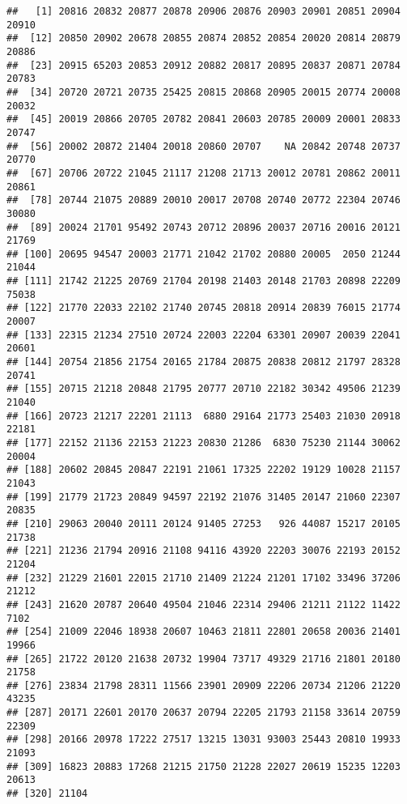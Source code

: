 \documentclass[]{article}
\newenvironment{Shaded}{\begin{snugshade}}{\end{snugshade}}
\newcommand{\KeywordTok}[1]{\textcolor[rgb]{0.13,0.29,0.53}{\textbf{#1}}}
\newcommand{\OperatorTok}[1]{\textcolor[rgb]{0.81,0.36,0.00}{\textbf{#1}}}
\newcommand{\NormalTok}[1]{#1}
\begin{document}
\begin{verbatim}
##   [1] 20816 20832 20877 20878 20906 20876 20903 20901 20851 20904 20910
##  [12] 20850 20902 20678 20855 20874 20852 20854 20020 20814 20879 20886
##  [23] 20915 65203 20853 20912 20882 20817 20895 20837 20871 20784 20783
##  [34] 20720 20721 20735 25425 20815 20868 20905 20015 20774 20008 20032
##  [45] 20019 20866 20705 20782 20841 20603 20785 20009 20001 20833 20747
##  [56] 20002 20872 21404 20018 20860 20707    NA 20842 20748 20737 20770
##  [67] 20706 20722 21045 21117 21208 21713 20012 20781 20862 20011 20861
##  [78] 20744 21075 20889 20010 20017 20708 20740 20772 22304 20746 30080
##  [89] 20024 21701 95492 20743 20712 20896 20037 20716 20016 20121 21769
## [100] 20695 94547 20003 21771 21042 21702 20880 20005  2050 21244 21044
## [111] 21742 21225 20769 21704 20198 21403 20148 21703 20898 22209 75038
## [122] 21770 22033 22102 21740 20745 20818 20914 20839 76015 21774 20007
## [133] 22315 21234 27510 20724 22003 22204 63301 20907 20039 22041 20601
## [144] 20754 21856 21754 20165 21784 20875 20838 20812 21797 28328 20741
## [155] 20715 21218 20848 21795 20777 20710 22182 30342 49506 21239 21040
## [166] 20723 21217 22201 21113  6880 29164 21773 25403 21030 20918 22181
## [177] 22152 21136 22153 21223 20830 21286  6830 75230 21144 30062 20004
## [188] 20602 20845 20847 22191 21061 17325 22202 19129 10028 21157 21043
## [199] 21779 21723 20849 94597 22192 21076 31405 20147 21060 22307 20835
## [210] 29063 20040 20111 20124 91405 27253   926 44087 15217 20105 21738
## [221] 21236 21794 20916 21108 94116 43920 22203 30076 22193 20152 21204
## [232] 21229 21601 22015 21710 21409 21224 21201 17102 33496 37206 21212
## [243] 21620 20787 20640 49504 21046 22314 29406 21211 21122 11422  7102
## [254] 21009 22046 18938 20607 10463 21811 22801 20658 20036 21401 19966
## [265] 21722 20120 21638 20732 19904 73717 49329 21716 21801 20180 21758
## [276] 23834 21798 28311 11566 23901 20909 22206 20734 21206 21220 43235
## [287] 20171 22601 20170 20637 20794 22205 21793 21158 33614 20759 22309
## [298] 20166 20978 17222 27517 13215 13031 93003 25443 20810 19933 21093
## [309] 16823 20883 17268 21215 21750 21228 22027 20619 15235 12203 20613
## [320] 21104
\end{verbatim}

\begin{Shaded}
\end{Shaded}
\end{document}
